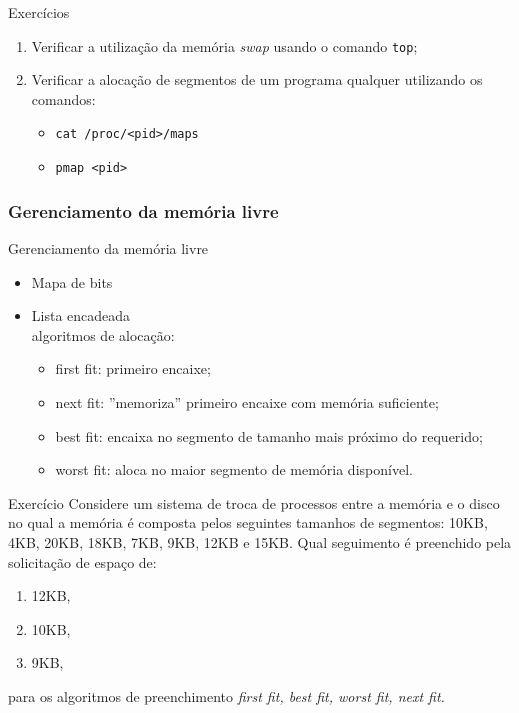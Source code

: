 \begin{frame}{Exerc\'icios}

\begin{enumerate}
	\item Verificar a utilizaç\~ao da mem\'oria {\em swap}
	usando o comando {\tt top};
	\item Verificar a alocaç\~ao de segmentos de um 
		programa qualquer utilizando os comandos:
		\begin{itemize}
			\item {\tt cat /proc/<pid>/maps}
			\item {\tt pmap <pid>} 
		\end{itemize}
\end{enumerate}

\end{frame}

\def\thetitle{Gerenciamento da memória livre}
\subsubsection{\thetitle}

\begin{frame}{\thetitle}
	
	\begin{itemize}
		\item Mapa de bits
		\item Lista encadeada\\ algoritmos de alocaç\~ao:
			\begin{itemize}
				\item first fit: primeiro encaixe;
				\item next fit: ''memoriza'' primeiro
					encaixe com mem\'oria suficiente;
				\item best fit: encaixa no segmento de tamanho
				mais pr\'oximo do requerido;
				\item worst fit: aloca no maior segmento
					de mem\'oria dispon\'ivel.					
			\end{itemize}
	\end{itemize}

\end{frame}

\begin{frame}{Exercício}
	\small
	Considere um sistema de troca de processos
	entre a memória e o disco no qual a memória
	é composta pelos seguintes tamanhos de segmentos:
	10KB, 4KB, 20KB, 18KB, 7KB, 9KB, 12KB e 15KB. 
	Qual seguimento 
	é preenchido pela solicitação de espaço de:
	\begin{enumerate}
	\item 12KB,
	\item 10KB,
	\item 9KB,
	\end{enumerate}
	para os algoritmos de preenchimento
	 {\em first fit, best fit, worst fit, next fit.}	
\end{frame}
